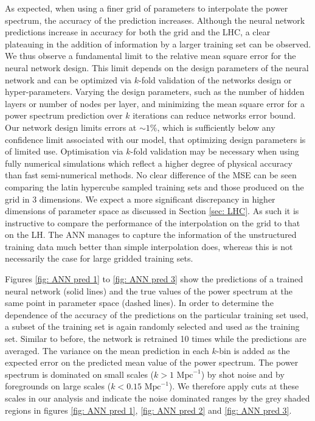 \documentclass[useAMS,usenatbib]{mnras}
\begin{document}
As expected, when using a finer grid of parameters to interpolate the power spectrum, the accuracy of the prediction increases. 
Although the neural network predictions increase in accuracy for both the grid and the LHC, a clear plateauing in the addition of information by a larger training set can be observed.
We thus observe a fundamental limit to the relative mean square error for the neural network design. 
This limit depends on the design parameters of the neural network and can be optimized via $k$-fold validation of the networks design or hyper-parameters.
Varying the design parameters, such as the number of hidden layers or number of nodes per layer, and minimizing the mean square error for a power spectrum prediction over $k$ iterations can reduce networks error bound.
Our network design limits errors at $\sim 1\%$, which is sufficiently below any confidence limit associated with our model, that optimizing design parameters is of limited use.
Optimisation via $k$-fold validation may be necessary when using fully numerical simulations which reflect a higher degree of physical accuracy than fast semi-numerical methods.
No clear difference of the MSE can be seen comparing the latin hypercube sampled training sets and those produced on the grid in 3 dimensions.
We expect a more significant discrepancy in higher dimensions of parameter space as discussed in Section \ref{sec: LHC}. 
As such it is instructive to compare the performance of the interpolation on the grid to that on the LH. 
The ANN manages to capture the information of the unstructured training data much better than simple interpolation does, whereas this is not necessarily the case for large gridded training sets.

Figures \ref{fig: ANN pred 1} to \ref{fig: ANN pred 3} show the predictions of a trained neural network (solid lines) and the true values of the power spectrum at the same point in parameter space (dashed lines). 
In order to determine the dependence of the accuracy of the predictions on the particular training set used, a subset of the training set is again randomly selected and used as the training set.
Similar to before, the network is retrained 10 times while the predictions are averaged. 
The variance on the mean prediction in each $k$-bin is added as the expected error on the predicted mean value of the power spectrum.
The power spectrum is dominated on small scales ($k>1 \text{ Mpc}^{-1}$) by shot noise and by foregrounds on large scales ($k < 0.15 \text{ Mpc}^{-1}$). 
We therefore apply cuts at these scales in our analysis and indicate the noise dominated ranges by the grey shaded regions in figures \ref{fig: ANN pred 1}, \ref{fig: ANN pred 2} and \ref{fig: ANN pred 3}.
\end{document}
